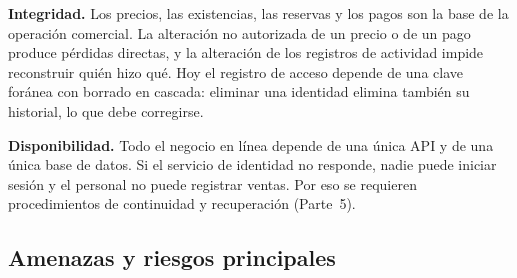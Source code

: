 \documentclass[12pt,letterpaper]{article}
\begin{document}
\textbf{Integridad.} Los precios, las existencias, las reservas y los pagos son la base de la operación comercial. La alteración no autorizada de un precio o de un pago produce pérdidas directas, y la alteración de los registros de actividad impide reconstruir quién hizo qué. Hoy el registro de acceso depende de una clave foránea con borrado en cascada: eliminar una identidad elimina también su historial, lo que debe corregirse.

\textbf{Disponibilidad.} Todo el negocio en línea depende de una única API y de una única base de datos. Si el servicio de identidad no responde, nadie puede iniciar sesión y el personal no puede registrar ventas. Por eso se requieren procedimientos de continuidad y recuperación (Parte~5).
\pagebreak
\subsection{Amenazas y riesgos principales}
\end{document}
